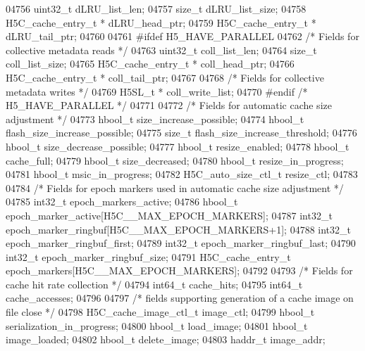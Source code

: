 \begin{DoxyCode}
04756     uint32\_t                    dLRU\_list\_len;
04757     \textcolor{keywordtype}{size\_t}                      dLRU\_list\_size;
04758     H5C\_cache\_entry\_t *     dLRU\_head\_ptr;
04759     H5C\_cache\_entry\_t *         dLRU\_tail\_ptr;
04760 
04761 \textcolor{preprocessor}{#ifdef H5\_HAVE\_PARALLEL}
04762     \textcolor{comment}{/* Fields for collective metadata reads */}
04763     uint32\_t                    coll\_list\_len;
04764     \textcolor{keywordtype}{size\_t}                      coll\_list\_size;
04765     H5C\_cache\_entry\_t *     coll\_head\_ptr;
04766     H5C\_cache\_entry\_t *     coll\_tail\_ptr;
04767 
04768     \textcolor{comment}{/* Fields for collective metadata writes */}
04769     H5SL\_t *                    coll\_write\_list;
04770 \textcolor{preprocessor}{#endif }\textcolor{comment}{/* H5\_HAVE\_PARALLEL */}\textcolor{preprocessor}{}
04771 
04772     \textcolor{comment}{/* Fields for automatic cache size adjustment */}
04773     hbool\_t         size\_increase\_possible;
04774     hbool\_t         flash\_size\_increase\_possible;
04775     \textcolor{keywordtype}{size\_t}          flash\_size\_increase\_threshold;
04776     hbool\_t         size\_decrease\_possible;
04777     hbool\_t         resize\_enabled;
04778     hbool\_t         cache\_full;
04779     hbool\_t         size\_decreased;
04780     hbool\_t         resize\_in\_progress;
04781     hbool\_t         msic\_in\_progress;
04782     H5C\_auto\_size\_ctl\_t     resize\_ctl;
04783 
04784     \textcolor{comment}{/* Fields for epoch markers used in automatic cache size adjustment */}
04785     int32\_t         epoch\_markers\_active;
04786     hbool\_t         epoch\_marker\_active[H5C\_\_MAX\_EPOCH\_MARKERS];
04787     int32\_t         epoch\_marker\_ringbuf[H5C\_\_MAX\_EPOCH\_MARKERS+1];
04788     int32\_t         epoch\_marker\_ringbuf\_first;
04789     int32\_t         epoch\_marker\_ringbuf\_last;
04790     int32\_t         epoch\_marker\_ringbuf\_size;
04791     H5C\_cache\_entry\_t       epoch\_markers[H5C\_\_MAX\_EPOCH\_MARKERS];
04792 
04793     \textcolor{comment}{/* Fields for cache hit rate collection */}
04794     int64\_t         cache\_hits;
04795     int64\_t         cache\_accesses;
04796 
04797     \textcolor{comment}{/* fields supporting generation of a cache image on file close */}
04798     H5C\_cache\_image\_ctl\_t   image\_ctl;
04799     hbool\_t         serialization\_in\_progress;
04800     hbool\_t         load\_image;
04801     hbool\_t                     image\_loaded;
04802     hbool\_t         delete\_image;
04803     haddr\_t             image\_addr;

\end{DoxyCode}
